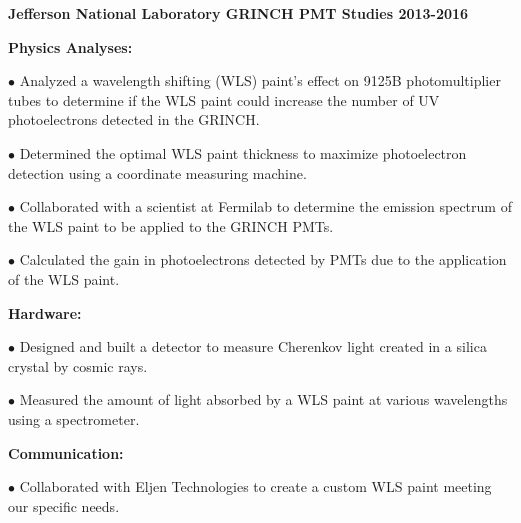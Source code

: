 \documentclass[letterpaper,10pt]{article}
\renewenvironment{itemize}{
  \begin{list}{}{
    \setlength{\leftmargin}{1.5em}
  }
}{
  \end{list}
}
\begin{document}
{\begin{itemize}
\vspace{3mm}

\item {\large {\bf Jefferson National Laboratory GRINCH PMT Studies 2013-2016} }

 \begin{itemize}\itemsep5pt \parskip0pt 
  \item \textbf{Physics Analyses:}
   
    \begin{itemize}\itemsep5pt \parskip0pt 
     \item $\bullet$ Analyzed a wavelength shifting (WLS) paint's effect on 9125B photomultiplier tubes to determine if the WLS paint could increase the number of UV photoelectrons detected in the GRINCH. 
     \item $\bullet$ Determined the optimal WLS paint thickness to maximize photoelectron detection using a coordinate measuring machine.
     \item $\bullet$ Collaborated with a scientist at Fermilab to determine the emission spectrum of the WLS paint to be applied to the GRINCH PMTs.
     \item $\bullet$ Calculated the gain in photoelectrons detected by PMTs due to the application of the WLS paint. 
     \end{itemize}

  \item \textbf{Hardware:}
    \begin{itemize}\itemsep5pt \parskip0pt 
     \item $\bullet$ Designed and built a detector to measure Cherenkov light created in a silica crystal by cosmic rays. 
     \item $\bullet$ Measured the amount of light absorbed by a WLS paint at various wavelengths using a spectrometer. 
    \end{itemize}
    
  \item \textbf{Communication:}
	\begin{itemize}\itemsep5pt
		\item $\bullet$ Collaborated with Eljen Technologies to create a custom WLS paint meeting our specific needs.
	\end{itemize}
    
 \end{itemize}

\vspace{3mm}


\end{itemize}}
\end{document}
